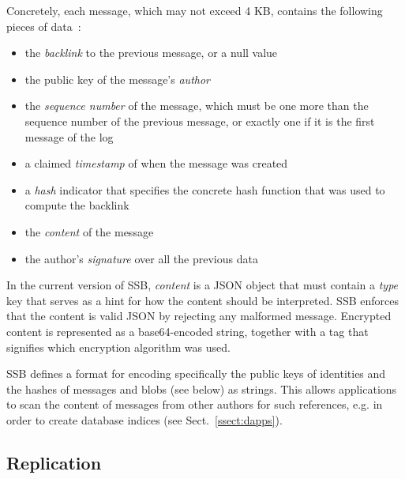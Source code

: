 \documentclass[9pt,sigconf]{acmart}
\begin{document}
Concretely, each message, which may not exceed 4 KB, contains the
following pieces of data~\cite{ssb-spec-messages}:

\begin{itemize}

\item the {\em backlink} to the previous message, or a null value

\item the public key of the message's {\em author}

\item the {\em sequence number} of the message, which must be one more
  than the sequence number of the previous message, or exactly one if
  it is the first message of the log

\item a claimed {\em timestamp} of when the message was created

\item a {\em hash} indicator that specifies the concrete hash function
  that was used to compute the backlink

\item the {\em content} of the message

\item the author's {\em signature} over all the previous data

\end{itemize}

In the current version of SSB, {\em content} is a JSON object that
must contain a {\em type} key that serves as a hint for how the
content should be interpreted. SSB enforces that the content is valid
JSON by rejecting any malformed message.  Encrypted content is
represented as a base64-encoded string, together with a tag that
signifies which encryption algorithm was used.

SSB defines a format for encoding specifically the public keys of
identities and the hashes of messages and blobs (see below) as
strings. This allows applications to scan the content of messages from
other authors for such references, e.g. in order to create database
indices (see Sect.~\ref{ssect:dapps}).

\subsection*{Replication}
\end{document}

